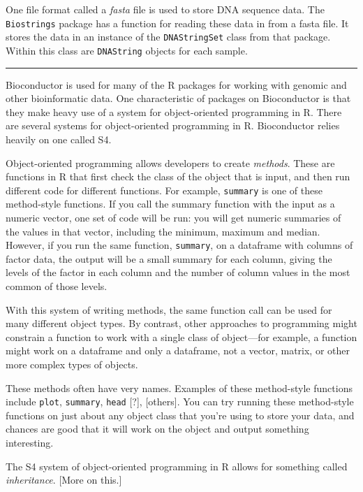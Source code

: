 \documentclass[]{tufte-book}
\begin{document}
One file format called a \emph{fasta} file is used to store DNA sequence data. The
\texttt{Biostrings} package has a function for reading these data in from a fasta file.
It stores the data in an instance of the \texttt{DNAStringSet} class from that package.
Within this class are \texttt{DNAString} objects for each sample.

\begin{center}\rule{0.5\linewidth}{0.5pt}\end{center}

Bioconductor is used for many of the R packages for working with genomic and
other bioinformatic data. One characteristic of packages on Bioconductor is that
they make heavy use of a system for object-oriented programming in R. There
are several systems for object-oriented programming in R. Bioconductor relies
heavily on one called S4.

Object-oriented programming allows developers to create \emph{methods}. These are
functions in R that first check the class of the object that is input, and then
run different code for different functions. For example, \texttt{summary} is one of these
method-style functions. If you call the summary function with the input as a
numeric vector, one set of code will be run: you will get numeric summaries of
the values in that vector, including the minimum, maximum and median. However,
if you run the same function, \texttt{summary}, on a dataframe with columns of factor
data, the output will be a small summary for each column, giving the levels of
the factor in each column and the number of column values in the most common
of those levels.

With this system of writing methods, the same function call can be used for
many different object types. By contrast, other approaches to programming might
constrain a function to work with a single class of object---for example, a
function might work on a dataframe and only a dataframe, not a vector, matrix,
or other more complex types of objects.

These methods often have very names. Examples of these method-style functions
include \texttt{plot}, \texttt{summary}, \texttt{head} {[}?{]}, {[}others{]}. You can try running these
method-style functions on just about any object class that you're using to
store your data, and chances are good that it will work on the object and
output something interesting.

The S4 system of object-oriented programming in R allows for something
called \emph{inheritance}. {[}More on this.{]}
\end{document}
